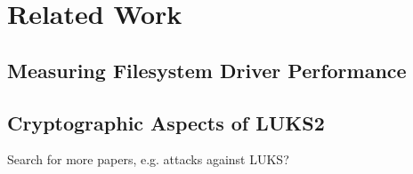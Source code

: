 \section{Related Work}
\label{chap:relatedwork}

\subsection{Measuring Filesystem Driver Performance}
\label{chap:relatedwork.fsperformance}

\subsection{Cryptographic Aspects of LUKS2}
\label{chap:relatedwork.cryptography}
\cite{Fruhwirth2005}

Search for more papers, e.g. attacks against LUKS?